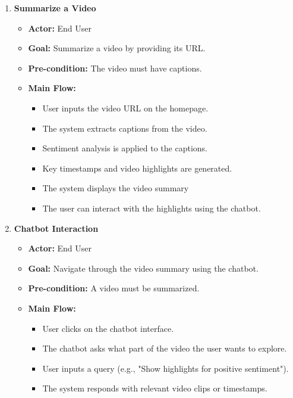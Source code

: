 \documentclass{bscs}
\begin{document}
\begin{enumerate}
\item \textbf{Summarize a Video} 

\begin{itemize}
    \item \textbf{Actor:}  End User
    \item \textbf{Goal:} Summarize a video by providing its URL. 
    
    \item \textbf{Pre-condition:} The video must have captions.

    \item \textbf{Main Flow:} 
        \begin{itemize}
        \item User inputs the video URL on the homepage.
        \item The system extracts captions from the video.
        \item Sentiment analysis is applied to the captions.
        \item Key timestamps and video highlights are generated.
        \item The system displays the video summary
        \item The user can interact with the highlights using the chatbot.
    \end{itemize}
    
\end{itemize}

\item \textbf{Chatbot Interaction} 

\begin{itemize}
    \item \textbf{Actor:}  End User
    \item \textbf{Goal:} Navigate through the video summary using the chatbot.
    
    \item \textbf{Pre-condition:} A video must be summarized.

    \item \textbf{Main Flow:} 
        \begin{itemize}
        \item User clicks on the chatbot interface.
        \item The chatbot asks what part of the video the user wants to explore.
        \item User inputs a query (e.g., "Show highlights for positive sentiment").
        \item The system responds with relevant video clips or timestamps.
    \end{itemize}
    

\end{itemize}
\end{enumerate}
\end{document}
